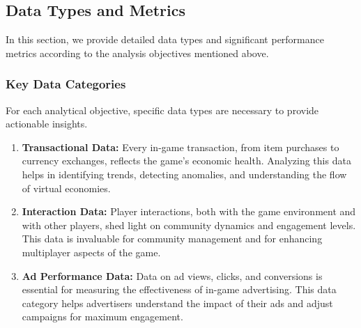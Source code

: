 \subsection{Data Types and Metrics}
In this section, we provide detailed data types and significant performance metrics according to the analysis objectives mentioned above.
\subsubsection{Key Data Categories}
For each analytical objective, specific data types are necessary to provide actionable insights.
\begin{enumerate}
    \item \textbf{Transactional Data:} Every in-game transaction, from item purchases to currency exchanges, reflects the game's economic health. Analyzing this data helps in identifying trends, detecting anomalies, and understanding the flow of virtual economies.
\item \textbf{Interaction Data:} Player interactions, both with the game environment and with other players, shed light on community dynamics and engagement levels. This data is invaluable for community management and for enhancing multiplayer aspects of the game.
\item \textbf{Ad Performance Data:} Data on ad views, clicks, and conversions is essential for measuring the effectiveness of in-game advertising. This data category helps advertisers understand the impact of their ads and adjust campaigns for maximum engagement.
\end{enumerate}


